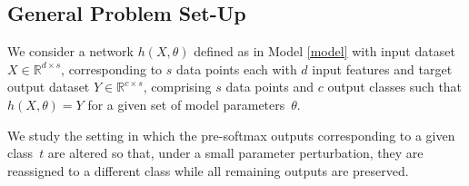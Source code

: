 \documentclass{article}
\theoremstyle{plain}
\theoremstyle{definition}
\theoremstyle{remark}
\begin{document}


\subsection{General Problem Set-Up}




We consider a network $h(X,\theta)$ defined as in Model \ref{model} with input dataset $X \in \mathbb{R}^{d \times s}$, corresponding to $s$ data points each with $d$ input features and target output dataset $Y \in \mathbb{R}^{c \times s}$, comprising $s$ data points and $c$ output classes such that $h(X,\theta) = Y$ for a given set of model parameters~$\theta$.


We study the setting in which the pre-softmax outputs corresponding to a given class~$t$ are altered so that, under a small parameter perturbation, they are reassigned to a different class while all remaining outputs are preserved.
\end{document}
